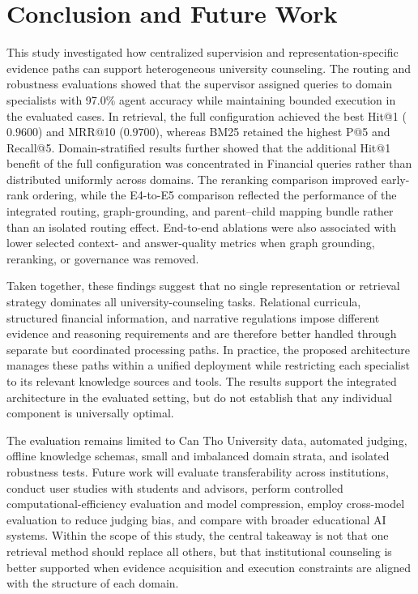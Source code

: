 \section{Conclusion and Future Work}
\label{sec:conclusion}

This study investigated how centralized supervision and representation-specific evidence paths can support heterogeneous university counseling. The routing and robustness evaluations showed that the supervisor assigned queries to domain specialists with 97.0\% agent accuracy while maintaining bounded execution in the evaluated cases. In retrieval, the full configuration achieved the best Hit@1 ($0.9600$) and MRR@10 ($0.9700$), whereas BM25 retained the highest P@5 and Recall@5. Domain-stratified results further showed that the additional Hit@1 benefit of the full configuration was concentrated in Financial queries rather than distributed uniformly across domains. The reranking comparison improved early-rank ordering, while the E4-to-E5 comparison reflected the performance of the integrated routing, graph-grounding, and parent--child mapping bundle rather than an isolated routing effect. End-to-end ablations were also associated with lower selected context- and answer-quality metrics when graph grounding, reranking, or governance was removed.

Taken together, these findings suggest that no single representation or retrieval strategy dominates all university-counseling tasks. Relational curricula, structured financial information, and narrative regulations impose different evidence and reasoning requirements and are therefore better handled through separate but coordinated processing paths. In practice, the proposed architecture manages these paths within a unified deployment while restricting each specialist to its relevant knowledge sources and tools. The results support the integrated architecture in the evaluated setting, but do not establish that any individual component is universally optimal.

The evaluation remains limited to Can Tho University data, automated judging, offline knowledge schemas, small and imbalanced domain strata, and isolated robustness tests. Future work will evaluate transferability across institutions, conduct user studies with students and advisors, perform controlled computational-efficiency evaluation and model compression, employ cross-model evaluation to reduce judging bias, and compare \system{} with broader educational AI systems. Within the scope of this study, the central takeaway is not that one retrieval method should replace all others, but that institutional counseling is better supported when evidence acquisition and execution constraints are aligned with the structure of each domain.

